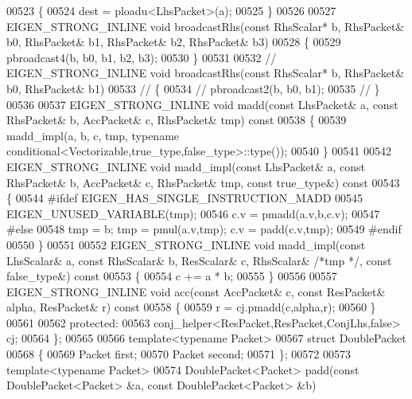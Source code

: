\begin{DoxyCode}
00523 \textcolor{keyword}{  }\{
00524     dest = ploadu<LhsPacket>(a);
00525   \}
00526 
00527   EIGEN\_STRONG\_INLINE \textcolor{keywordtype}{void} broadcastRhs(\textcolor{keyword}{const} RhsScalar* b, RhsPacket& b0, RhsPacket& b1, RhsPacket& b2, 
      RhsPacket& b3)
00528   \{
00529     pbroadcast4(b, b0, b1, b2, b3);
00530   \}
00531   
00532 \textcolor{comment}{//   EIGEN\_STRONG\_INLINE void broadcastRhs(const RhsScalar* b, RhsPacket& b0, RhsPacket& b1)}
00533 \textcolor{comment}{//   \{}
00534 \textcolor{comment}{//     pbroadcast2(b, b0, b1);}
00535 \textcolor{comment}{//   \}}
00536 
00537   EIGEN\_STRONG\_INLINE \textcolor{keywordtype}{void} madd(\textcolor{keyword}{const} LhsPacket& a, \textcolor{keyword}{const} RhsPacket& b, AccPacket& c, RhsPacket& tmp)\textcolor{keyword}{ const}
00538 \textcolor{keyword}{  }\{
00539     madd\_impl(a, b, c, tmp, \textcolor{keyword}{typename} conditional<Vectorizable,true\_type,false\_type>::type());
00540   \}
00541 
00542   EIGEN\_STRONG\_INLINE \textcolor{keywordtype}{void} madd\_impl(\textcolor{keyword}{const} LhsPacket& a, \textcolor{keyword}{const} RhsPacket& b, AccPacket& c, RhsPacket& tmp, \textcolor{keyword}{
      const} true\_type&)\textcolor{keyword}{ const}
00543 \textcolor{keyword}{  }\{
00544 \textcolor{preprocessor}{#ifdef EIGEN\_HAS\_SINGLE\_INSTRUCTION\_MADD}
00545     EIGEN\_UNUSED\_VARIABLE(tmp);
00546     c.v = pmadd(a.v,b,c.v);
00547 \textcolor{preprocessor}{#else}
00548     tmp = b; tmp = pmul(a.v,tmp); c.v = padd(c.v,tmp);
00549 \textcolor{preprocessor}{#endif}
00550   \}
00551 
00552   EIGEN\_STRONG\_INLINE \textcolor{keywordtype}{void} madd\_impl(\textcolor{keyword}{const} LhsScalar& a, \textcolor{keyword}{const} RhsScalar& b, ResScalar& c, RhsScalar& \textcolor{comment}{/*tmp
      */}, \textcolor{keyword}{const} false\_type&)\textcolor{keyword}{ const}
00553 \textcolor{keyword}{  }\{
00554     c += a * b;
00555   \}
00556 
00557   EIGEN\_STRONG\_INLINE \textcolor{keywordtype}{void} acc(\textcolor{keyword}{const} AccPacket& c, \textcolor{keyword}{const} ResPacket& alpha, ResPacket& r)\textcolor{keyword}{ const}
00558 \textcolor{keyword}{  }\{
00559     r = cj.pmadd(c,alpha,r);
00560   \}
00561 
00562 \textcolor{keyword}{protected}:
00563   conj\_helper<ResPacket,ResPacket,ConjLhs,false> cj;
00564 \};
00565 
00566 \textcolor{keyword}{template}<\textcolor{keyword}{typename} Packet>
00567 \textcolor{keyword}{struct }DoublePacket
00568 \{
00569   Packet first;
00570   Packet second;
00571 \};
00572 
00573 \textcolor{keyword}{template}<\textcolor{keyword}{typename} Packet>
00574 DoublePacket<Packet> padd(\textcolor{keyword}{const} DoublePacket<Packet> &a, \textcolor{keyword}{const} DoublePacket<Packet> &b)

\end{DoxyCode}
